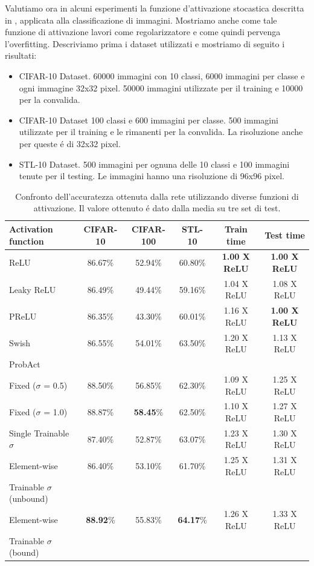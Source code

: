 \documentclass[a4paper,10pt]{article}
\begin{document}
 Valutiamo ora in alcuni esperimenti la funzione d'attivazione stocastica descritta in \cite{lee2019probact}, applicata alla classificazione di immagini. Mostriamo anche come tale funzione di attivazione lavori come regolarizzatore e come quindi pervenga l'overfitting. Descriviamo prima i dataset utilizzati e mostriamo di seguito i risultati:
 \begin{itemize}
  \item CIFAR-10 Dataset. 60000 immagini con 10 classi, 6000 immagini per classe e ogni immagine 32x32 pixel. 50000 immagini utilizzate per il training e 10000 per la convalida. 
  \item CIFAR-10 Dataset 100 classi e 600 immagini per classe. 500 immagini utilizzate per il training e le rimanenti per la convalida. La risoluzione anche per queste \'e di 32x32 pixel. 
  \item STL-10 Dataset. 500 immagini per ognuna delle 10 classi e 100 immagini tenute per il testing. Le immagini hanno una risoluzione di 96x96 pixel.
 \end{itemize}
 
 \begin{table}[h]\caption{Confronto dell'accuratezza ottenuta dalla rete utilizzando diverse funzioni di attivazione. Il valore ottenuto \'e dato dalla media su tre set di test.}\label{ActFuncTestTab}
   \centering
   \begin{tabular}[h]{|l|c|c|c|c|c|}
    \hline
   Activation function & CIFAR-10 & CIFAR-100 & STL-10 & Train time & Test time \\ \hline
   ReLU & 86.67\% & 52.94\% & 60.80\% & \textbf{1.00 X ReLU} & \textbf{1.00 X ReLU} \\ 
   Leaky ReLU & 86.49\% & 49.44\% & 59.16\% & 1.04 X ReLU & 1.08 X ReLU \\
   PReLU & 86.35\% & 43.30\% & 60.01\% & 1.16 X ReLU & \textbf{1.00 X ReLU} \\
   Swish & 86.55\% & 54.01\% & 63.50\% & 1.20 X ReLU & 1.13 X ReLU \\
   \hline
   ProbAct & & & & & \\
   \quad Fixed ($\sigma$ = 0.5) & 88.50\% & 56.85\% & 62.30\% & 1.09 X ReLU & 1.25 X ReLU \\
   \quad Fixed ($\sigma$ = 1.0) & 88.87\% & \textbf{58.45}\% & 62.50\% & 1.10 X ReLU & 1.27 X ReLU \\
   \quad Single Trainable $\sigma$ & 87.40\% & 52.87\% & 63.07\% & 1.23 X ReLU & 1.30 X ReLU \\
   \quad Element-wise & 86.40\% & 53.10\% & 61.70\% & 1.25 X ReLU & 1.31 X ReLU \\
   \qquad Trainable $\sigma$ (unbound)  & & & & & \\
   \quad Element-wise & \textbf{88.92}\% & 55.83\% & \textbf{64.17}\% & 1.26 X ReLU & 1.33 X ReLU \\
   \qquad Trainable $\sigma$ (bound)  & & & & & \\
   \hline
   \end{tabular}
  \end{table}
  
\end{document}
